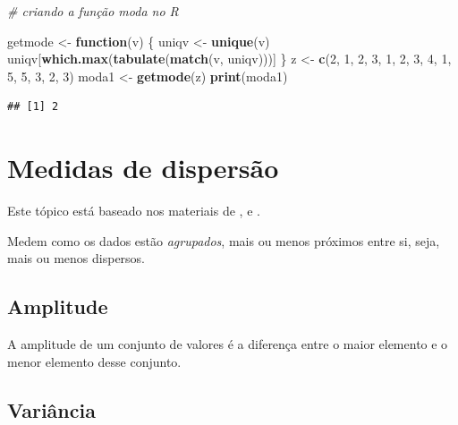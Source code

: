 \documentclass[
]{book}
\newenvironment{Shaded}{\begin{snugshade}}{\end{snugshade}}
\newcommand{\CommentTok}[1]{\textcolor[rgb]{0.56,0.35,0.01}{\textit{#1}}}
\newcommand{\ControlFlowTok}[1]{\textcolor[rgb]{0.13,0.29,0.53}{\textbf{#1}}}
\newcommand{\DecValTok}[1]{\textcolor[rgb]{0.00,0.00,0.81}{#1}}
\newcommand{\KeywordTok}[1]{\textcolor[rgb]{0.13,0.29,0.53}{\textbf{#1}}}
\newcommand{\NormalTok}[1]{#1}
\newcommand{\StringTok}[1]{\textcolor[rgb]{0.31,0.60,0.02}{#1}}
\begin{document}
\begin{Shaded}
\begin{Highlighting}[]
\CommentTok{# criando a função moda no R}

\NormalTok{getmode <-}\StringTok{ }\ControlFlowTok{function}\NormalTok{(v) \{}
\NormalTok{    uniqv <-}\StringTok{ }\KeywordTok{unique}\NormalTok{(v)}
\NormalTok{    uniqv[}\KeywordTok{which.max}\NormalTok{(}\KeywordTok{tabulate}\NormalTok{(}\KeywordTok{match}\NormalTok{(v, uniqv)))]}
\NormalTok{\}}
\NormalTok{z <-}\StringTok{ }\KeywordTok{c}\NormalTok{(}\DecValTok{2}\NormalTok{, }\DecValTok{1}\NormalTok{, }\DecValTok{2}\NormalTok{, }\DecValTok{3}\NormalTok{, }\DecValTok{1}\NormalTok{, }\DecValTok{2}\NormalTok{, }\DecValTok{3}\NormalTok{, }\DecValTok{4}\NormalTok{, }\DecValTok{1}\NormalTok{, }\DecValTok{5}\NormalTok{, }\DecValTok{5}\NormalTok{, }\DecValTok{3}\NormalTok{, }\DecValTok{2}\NormalTok{, }\DecValTok{3}\NormalTok{)}
\NormalTok{moda1 <-}\StringTok{ }\KeywordTok{getmode}\NormalTok{(z)}
\KeywordTok{print}\NormalTok{(moda1)}
\end{Highlighting}
\end{Shaded}

\begin{verbatim}
## [1] 2
\end{verbatim}

\hypertarget{medidas-de-dispersuxe3o}{%
\section{Medidas de dispersão}\label{medidas-de-dispersuxe3o}}

Este tópico está baseado nos materiais de \citet{Hoffmann2006}, \citet{Morettin2013} e \citet{Sartoris2013}.

Medem como os dados estão \textit{agrupados}, mais ou menos próximos entre si,
seja, mais ou menos dispersos.

\hypertarget{amplitude}{%
\subsection{Amplitude}\label{amplitude}}

A amplitude de um conjunto de valores é a diferença entre o maior elemento e o menor elemento desse conjunto.

\hypertarget{variuxe2ncia}{%
\subsection{Variância}\label{variuxe2ncia}}
\end{document}

